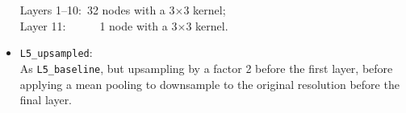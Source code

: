 \begin{itemize}
%
\hspace*{1em}Layers 1--10:~32 nodes with a 3$\times$3 kernel; \\
\hspace*{1em}Layer 11:~~~~~~1 node with a 3$\times$3 kernel.
%
\item \texttt{L5\_upsampled}: \\
\hspace*{1em}As \texttt{L5\_baseline}, but upsampling by a factor 2 before the first layer, before applying a mean pooling to downsample to the original resolution before the final layer.
\end{itemize}

